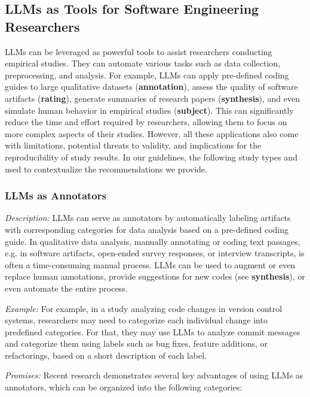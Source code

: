 \documentclass[11pt]{article}
\begin{document}
\subsection{LLMs as Tools for Software Engineering Researchers}

LLMs can be leveraged as powerful tools to assist researchers conducting empirical studies.
They can automate various tasks such as data collection, preprocessing, and analysis.
For example, LLMs can apply pre-defined coding guides to large qualitative datasets (\textbf{annotation}), assess the quality of software artifacts (\textbf{rating}), generate summaries of research papers (\textbf{synthesis}), and even simulate human behavior in empirical studies (\textbf{subject}).
This can significantly reduce the time and effort required by researchers, allowing them to focus on more complex aspects of their studies.
However, all these applications also come with limitations, potential threats to validity, and implications for the reproducibility of study results.
In our guidelines, the following study types and used to contextualize the recommendations we provide.


\subsubsection{LLMs as Annotators}

\emph{Description:} LLMs can serve as annotators by automatically labeling artifacts with corresponding categories for data analysis based on a pre-defined coding guide.
In qualitative data analysis, manually annotating or coding text passages, e.g. in software artifacts, open-ended survey responses, or interview transcripts, is often a time-consuming manual process.
LLMs can be used to augment or even replace human annotations, provide suggestions for new codes (see \textbf{synthesis}), or even automate the entire process.

\emph{Example:} For example, in a study analyzing code changes in version control systems, researchers may need to categorize each individual change into predefined categories.
For that, they may use LLMs to analyze commit messages and categorize them using labels such as bug fixes, feature additions, or refactorings, based on a short description of each label.

\emph{Promises:} Recent research demonstrates several key advantages of using LLMs as annotators, which can be organized into the following categories:
\end{document}
